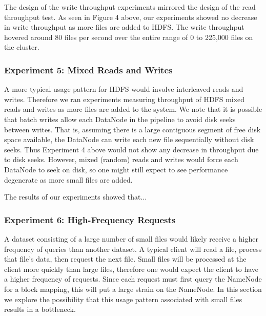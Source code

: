 \documentclass[11pt, a4paper]{article}
\begin{document}
\begin{multicols*}{2}
The design of the write throughput experiments mirrored the design of the read throughput test. As seen in Figure 4 above, our experiments showed no decrease in write throughput as more files are added to HDFS. The write throughput hovered around 80 files per second over the entire range of 0 to 225,000 files on the cluster.

\subsubsection{Experiment 5: Mixed Reads and Writes}\label{ReadWriteThroughput}
A more typical usage pattern for HDFS would involve interleaved reads and writes. Therefore we ran experiments measuring throughput of HDFS mixed reads and writes as more files are added to the system. We note that it is possible that batch writes allow each DataNode in the pipeline to avoid disk seeks between writes. That is, assuming there is a large contiguous segment of free disk space available, the DataNode can write each new file sequentially without disk seeks. Thus Experiment 4 above would not show any decrease in throughput due to disk seeks. However, mixed (random) reads and writes would force each DataNode to seek on disk, so one might still expect to see performance degenerate as more small files are added.

The results of our experiments showed that...

\subsubsection{Experiment 6: High-Frequency Requests}\label{HighFrequencyRequests}
A dataset consisting of a large number of small files would likely receive a higher frequency of queries than another dataset. A typical client will read a file, process that file's data, then request the next file. Small files will be processed at the client more quickly than large files, therefore one would expect the client to have a higher frequency of requests. Since each request must first query the NameNode for a block mapping, this will put a large strain on the NameNode. In this section we explore the possibility that this usage pattern associated with small files results in a bottleneck.


\end{multicols*}
\end{document}
